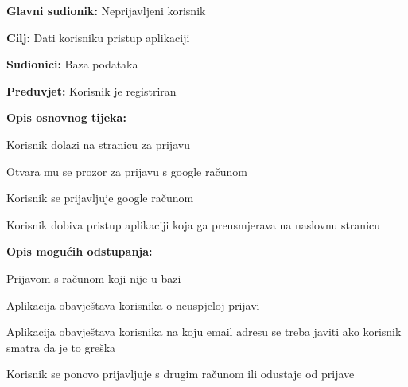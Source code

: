 					\noindent {}
					\begin{packed_item}
	
						\item \textbf{Glavni sudionik:} Neprijavljeni korisnik
						\item \textbf{Cilj:} Dati korisniku pristup aplikaciji
						\item \textbf{Sudionici:} Baza podataka
						\item \textbf{Preduvjet:} Korisnik je registriran
						\item \textbf{Opis osnovnog tijeka:}
						
						\item[] \begin{packed_enum}
	
							\item Korisnik dolazi na stranicu za prijavu
							\item Otvara mu se prozor za prijavu s google računom
							\item Korisnik se prijavljuje google računom
							\item Korisnik dobiva pristup aplikaciji koja ga preusmjerava na naslovnu stranicu
						\end{packed_enum}
						
						\item \textbf{Opis mogućih odstupanja:}

						\item[] \begin{packed_item}

							\item[2.a] Prijavom s računom koji nije u bazi
							\item[] \begin{packed_enum}

								\item Aplikacija obavještava korisnika o neuspjeloj prijavi
								\item Aplikacija obavještava korisnika na koju email adresu se treba javiti ako korisnik smatra da je to greška
								\item Korisnik se ponovo prijavljuje s drugim računom ili odustaje od prijave

							\end{packed_enum}

						\end{packed_item}
					\end{packed_item}

